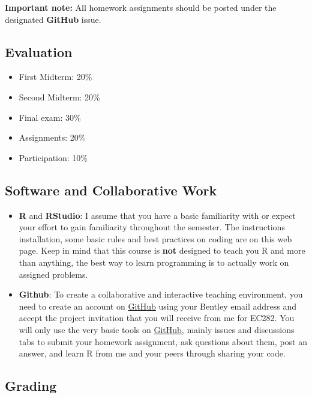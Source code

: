 \documentclass[
]{book}
\providecommand{\tightlist}{%
  \setlength{\itemsep}{0pt}\setlength{\parskip}{0pt}}
\begin{document}
\textbf{Important note:} All homework assignments should be posted under the designated \textbf{GitHub} issue.

\hypertarget{evaluation}{%
\subsection*{Evaluation}\label{evaluation}}

\begin{itemize}
\tightlist
\item
  First Midterm: 20\%
\item
  Second Midterm: 20\%
\item
  Final exam: 30\%
\item
  Assignments: 20\%
\item
  Participation: 10\%
\end{itemize}

\hypertarget{software-and-collaborative-work}{%
\subsection*{Software and Collaborative Work}\label{software-and-collaborative-work}}

\begin{itemize}
\item
  \textbf{R} and \textbf{RStudio}: I assume that you have a basic familiarity with or expect your effort to gain familiarity throughout the semester. The instructions installation, some basic rules and best practices on coding are on this web page. Keep in mind that this course is \textbf{not} designed to teach you R and more than anything, the best way to learn programming is to actually work on assigned problems.
\item
  \textbf{Github}: To create a collaborative and interactive teaching environment, you need to create an account on \href{https://github.com/}{GitHub} using your Bentley email address and accept the project invitation that you will receive from me for EC282. You will only use the very basic tools on \href{https://github.com/}{GitHub}, mainly issues and discussions tabs to submit your homework assignment, ask questions about them, post an answer, and learn R from me and your peers through sharing your code.
\end{itemize}

\hypertarget{grading}{%
\subsection*{Grading}\label{grading}}
\end{document}

